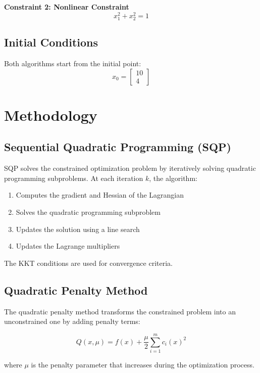 \documentclass[11pt,a4paper]{article}
\begin{document}
\textbf{Constraint 2: Nonlinear Constraint}
\begin{equation}
x_1^2 + x_2^2 = 1
\end{equation}

\subsection{Initial Conditions}
Both algorithms start from the initial point:
\begin{equation}
x_0 = \begin{bmatrix} 10 \\ 4 \end{bmatrix}
\end{equation}

\section{Methodology}

\subsection{Sequential Quadratic Programming (SQP)}
SQP solves the constrained optimization problem by iteratively solving quadratic programming subproblems. At each iteration $k$, the algorithm:

\begin{enumerate}
    \item Computes the gradient and Hessian of the Lagrangian
    \item Solves the quadratic programming subproblem
    \item Updates the solution using a line search
    \item Updates the Lagrange multipliers
\end{enumerate}

The KKT conditions are used for convergence criteria.

\subsection{Quadratic Penalty Method}
The quadratic penalty method transforms the constrained problem into an unconstrained one by adding penalty terms:

\begin{equation}
Q(x, \mu) = f(x) + \frac{\mu}{2} \sum_{i=1}^{m} c_i(x)^2
\end{equation}

where $\mu$ is the penalty parameter that increases during the optimization process.
\end{document}
